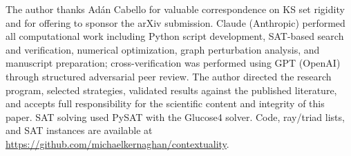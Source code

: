 \documentclass[twocolumn,pra,superscriptaddress,nofootinbib]{revtex4-2}
\begin{document}
\begin{acknowledgments}
The author thanks Ad\'an Cabello for valuable correspondence on KS set rigidity
and for offering to sponsor the arXiv submission.
Claude (Anthropic) performed all computational work including Python script development, SAT-based search and verification, numerical optimization, graph perturbation analysis, and manuscript preparation; cross-verification was performed using GPT (OpenAI) through structured adversarial peer review.  The author directed the research program, selected strategies, validated results against the published literature, and accepts full responsibility for the scientific content and integrity of this paper.
SAT solving used PySAT with the Glucose4 solver.
Code, ray/triad lists, and SAT instances are available at
\url{https://github.com/michaelkernaghan/contextuality}.
\end{acknowledgments}
\end{document}
